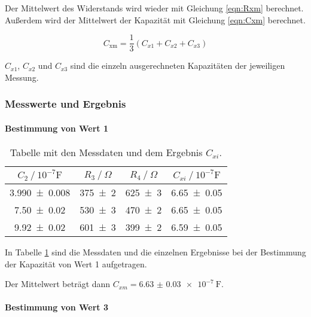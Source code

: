 Der Mittelwert des Widerstands wird wieder mit Gleichung \eqref{eqn:Rxm} berechnet.
Außerdem wird der Mittelwert der Kapazität mit Gleichung \eqref{eqn:Cxm} berechnet.

\begin{equation}
  C_{\text{xm}} = \frac{1}{3}(C_{x1} + C_{x2} + C_{x3})
  \label{eqn:Cxm}
\end{equation}

$C_{x1}$, $C_{x2}$ und $C_{x3}$ sind die einzeln ausgerechneten Kapazitäten der
jeweiligen Messung.

\subsubsection{Messwerte und Ergebnis}
\label{subsubsec:kapme}

\paragraph{Bestimmung von Wert 1}

\begin{table}
  \centering
  \caption{Tabelle mit den Messdaten und dem Ergebnis $C_{xi}$.}
  \label{tab:Kapazitaet1}
  \begin{tabular}{c c c c}
    \toprule
    $C_2 \ /\ 10^{-7} \si{\farad}$ & $R_3 \ /\ \si{\Omega}$ & $R_4 \ /\ \si{\Omega}$ & $C_{xi} \ /\ 10^{-7} \si{\farad}$\\
    \midrule
    \num{3.990 +- 0.008} & \num{375 +- 2} & \num{625 +- 3} & \num{6.65 +- 0.05}\\
    \num{7.50 +- 0.02} & \num{530 +- 3} & \num{470 +- 2} & \num{6.65 +- 0.05}\\
    \num{9.92 +- 0.02} & \num{601 +- 3} & \num{399 +- 2} & \num{6.59 +- 0.05}\\
    \bottomrule
  \end{tabular}
\end{table}

In Tabelle \ref{tab:Kapazitaet1} sind die Messdaten und die einzelnen
Ergebnisse bei der Bestimmung der Kapazität von Wert 1 aufgetragen.

Der Mittelwert beträgt dann $C_{xm} = \SI{6.63(3)e-7}{\farad}$.

\paragraph{Bestimmung von Wert 3}

